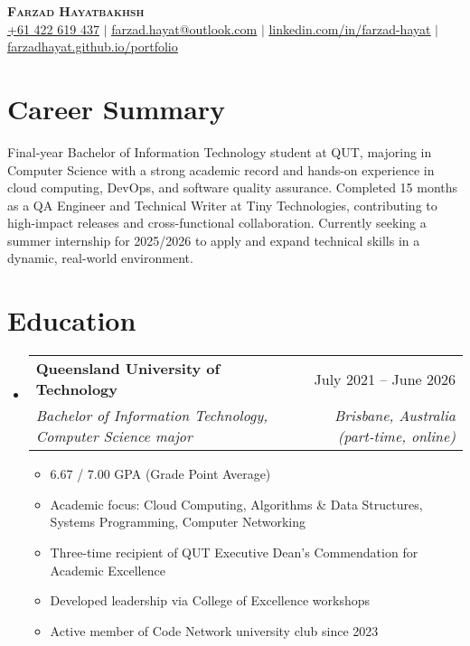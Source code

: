 \documentclass[a4,11pt]{article}
\makeatletter
\newcommand{\resumeItem}[1]{
  \item\small{
    {#1 \vspace{-2pt}}
  }
}
\newcommand{\resumeSubheading}[4]{
  \vspace{-2pt}\item
    \begin{tabular*}{0.97\textwidth}[t]{l@{\extracolsep{\fill}}r}
      \textbf{#1} & #2 \\
      \textit{\small#3} & \textit{\small #4} \\
    \end{tabular*}\vspace{-7pt}
}
\newcommand{\resumeSubHeadingListStart}{\begin{itemize}[leftmargin=0.15in, label={}]}
\newcommand{\resumeSubHeadingListEnd}{\end{itemize}}
\newcommand{\resumeItemListStart}{\begin{itemize}}
\newcommand{\resumeItemListEnd}{\end{itemize}\vspace{-5pt}}
\makeatother
\begin{document}

\begin{center}
    \textbf{\Huge \scshape Farzad Hayatbakhsh} \\ \vspace{1pt}
    \small \href{tel:+61422619437}{\underline{+61 422 619 437}} $|$ \href{mailto:farzad.hayat@outlook.com}{\underline{farzad.hayat@outlook.com}} $|$ 
    \href{https://linkedin.com/in/farzad-hayat}{\underline{linkedin.com/in/farzad-hayat}} $|$
    \href{https://farzadhayat.github.io/portfolio}{\underline{farzadhayat.github.io/portfolio}}
\end{center}


\section{Career Summary}
\begin{itemize}[leftmargin=0.15in, label={}]
  \small{\item{
    Final-year Bachelor of Information Technology student at QUT, majoring in Computer Science with a strong academic record and hands-on experience in cloud computing, DevOps, and software quality assurance. Completed 15 months as a QA Engineer and Technical Writer at Tiny Technologies, contributing to high-impact releases and cross-functional collaboration. Currently seeking a summer internship for 2025/2026 to apply and expand technical skills in a dynamic, real-world environment.
  }}
\end{itemize}


\section{Education}
  \resumeSubHeadingListStart
    \resumeSubheading
      {Queensland University of Technology}{July 2021 -- June 2026}
      {Bachelor of Information Technology, Computer Science major}{Brisbane, Australia (part-time, online)}
      \resumeItemListStart
        \resumeItem{6.67 / 7.00 GPA (Grade Point Average)}
        \resumeItem{Academic focus: Cloud Computing, Algorithms \& Data Structures, Systems Programming, Computer Networking}
        \resumeItem{Three-time recipient of QUT Executive Dean’s Commendation for Academic Excellence}
        \resumeItem{Developed leadership via College of Excellence workshops}
        \resumeItem{Active member of Code Network university club since 2023}
      \resumeItemListEnd
  \resumeSubHeadingListEnd
\end{document}
